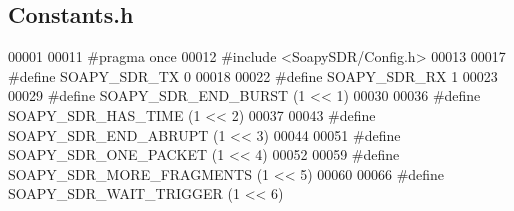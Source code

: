 \subsection{Constants.\+h}
\label{Constants_8h_source}

\begin{DoxyCode}
00001 
00011 \textcolor{preprocessor}{#pragma once}
00012 \textcolor{preprocessor}{#include <SoapySDR/Config.h>}
00013 
00017 \textcolor{preprocessor}{#define SOAPY\_SDR\_TX 0}
00018 
00022 \textcolor{preprocessor}{#define SOAPY\_SDR\_RX 1}
00023 
00029 \textcolor{preprocessor}{#define SOAPY\_SDR\_END\_BURST (1 << 1)}
00030 
00036 \textcolor{preprocessor}{#define SOAPY\_SDR\_HAS\_TIME (1 << 2)}
00037 
00043 \textcolor{preprocessor}{#define SOAPY\_SDR\_END\_ABRUPT (1 << 3)}
00044 
00051 \textcolor{preprocessor}{#define SOAPY\_SDR\_ONE\_PACKET (1 << 4)}
00052 
00059 \textcolor{preprocessor}{#define SOAPY\_SDR\_MORE\_FRAGMENTS (1 << 5)}
00060 
00066 \textcolor{preprocessor}{#define SOAPY\_SDR\_WAIT\_TRIGGER (1 << 6)}
\end{DoxyCode}
